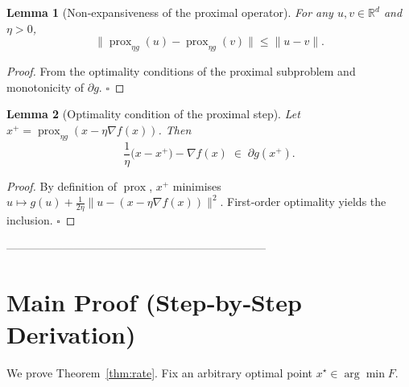 \documentclass{article}
\newtheorem{lemma}{Lemma}
\newcommand{\prox}{\operatorname{prox}}
\newcommand{\R}{\mathbb{R}}
\begin{document}
\begin{lemma}[Non‑expansiveness of the proximal operator]
\label{lem:nonexpansive}
For any $u,v\in\R^{d}$ and $\eta>0$,
\[
\big\|\prox_{\eta g}(u)-\prox_{\eta g}(v)\big\|\le\|u-v\|.
\]
\end{lemma}
\begin{proof}
From the optimality conditions of the proximal subproblem and monotonicity of $\partial g$. \hfill $\square$
\end{proof}

\begin{lemma}[Optimality condition of the proximal step]
\label{lem:optcond}
Let $x^{+}=\prox_{\eta g}(x-\eta\nabla f(x))$. Then
\[
\frac{1}{\eta}\bigl(x-x^{+}\bigr)-\nabla f(x)\;\in\;\partial g(x^{+}).
\]
\end{lemma}
\begin{proof}
By definition of $\prox$, $x^{+}$ minimises $u\mapsto g(u)+\frac{1}{2\eta}\|u-(x-\eta\nabla f(x))\|^{2}$.  
First‑order optimality yields the inclusion. \hfill $\square$
\end{proof}

---------------------------------------------------------------------

\section*{Main Proof (Step‑by‑Step Derivation)}
We prove Theorem~\ref{thm:rate}.  
Fix an arbitrary optimal point $x^{\star}\in\arg\min F$.
\end{document}
